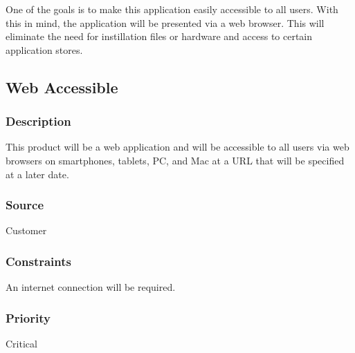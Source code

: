 One of the goals is to make this application easily accessible to all users. With this in mind, the application will be presented via a web browser. This will eliminate the need for instillation files or hardware and access to certain application stores.

\subsection{Web Accessible}
\subsubsection{Description}
This product will be a web application and will be accessible to all users via web browsers on smartphones, tablets, PC, and Mac at a URL that will be specified at a later date.
\subsubsection{Source}
Customer
\subsubsection{Constraints}
An internet connection will be required.
\subsubsection{Priority}
Critical